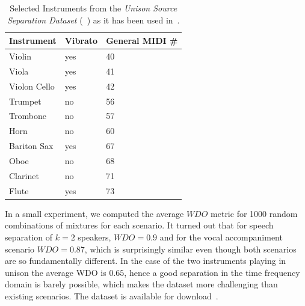 \begin{table}
\begin{center}
\footnotesize
\begin{tabular}{ l l l}
  Instrument & Vibrato &  General MIDI \# \\
  \hline
  Violin & yes & 40 \\
  Viola & yes & 41 \\
  Violon Cello & yes & 42 \\
  Trumpet & no & 56 \\
  Trombone & no & 57\\
  Horn & no & 60  \\
  Bariton Sax & yes & 67 \\
  Oboe & no & 68\\
  Clarinet & no & 71\\
  Flute & yes & 73\\
\end{tabular}
\end{center}
\caption{Selected Instruments from the \emph{Unison Source Separation Dataset} (~\cite{oss_unison}) as it has been used in~\cite{stoeter14, stoeter16}.}
\label{tab:testset}
\end{table}

In a small experiment, we computed the average \(WDO\) metric for 1000 random combinations of mixtures for each scenario.
It turned out that for speech separation of \(k=2\) speakers, \(WDO=0.9\) and for the vocal accompaniment scenario \(WDO=0.87\), which is surprisingly similar even though both scenarios are so fundamentally different.
In the case of the two instruments playing in unison the average WDO is \(0.65\), hence a good separation in the time frequency domain is barely possible, which makes the dataset more challenging than existing scenarios.
The dataset is available for download~\cite{oss_unison}.

\begin{figure}
\end{figure}

